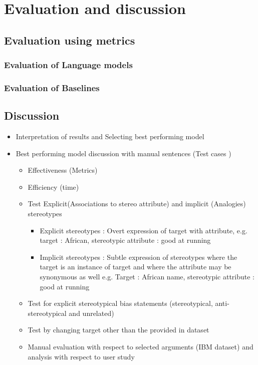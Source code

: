 \chapter{Evaluation and discussion}

\section{Evaluation using metrics}

\subsection{Evaluation of Language models}
\subsection{Evaluation of Baselines}


\section{Discussion}
\begin{itemize}
    \item Interpretation of results and Selecting best performing model 
    \item Best performing model discussion with manual sentences (Test cases ) 
    \begin{itemize}
        \item Effectiveness (Metrics)
        \item Efficiency (time)
        \item Test Explicit(Associations to stereo attribute) and implicit (Analogies) stereotypes
        \begin{itemize}
            \item Explicit stereotypes : Overt expression of target with attribute, e.g. target : African, stereotypic attribute : good at running
            \item Implicit stereotypes : Subtle expression of stereotypes where the target is an instance of target and where the attribute may be synonymous as well
            e.g. Target : African name, stereotypic attribute :  good at running 
        \end{itemize} 
        \item Test for explicit stereotypical bias statements  (stereotypical, anti-stereotypical and unrelated)
        \item Test by changing target other than the provided in dataset 
        \item Manual evaluation with respect to selected arguments (IBM dataset) and analysis with respect to user study 
    \end{itemize}
\end{itemize}